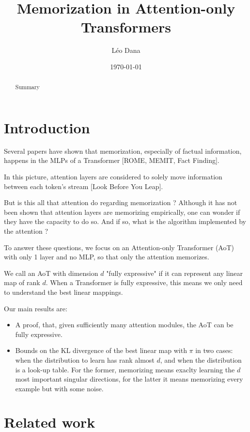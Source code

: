 \documentclass{article}
\title{Memorization in Attention-only Transformers}
\author{Léo Dana}
\date{\today}
\begin{document}
\maketitle


\begin{abstract}
    Summary
\end{abstract}

\section{Introduction}

Several papers have shown that memorization, especially of factual information, happens in the MLPs of a Transformer
[ROME, MEMIT, Fact Finding]. 
\bigbreak

In this picture, attention layers are considered to solely move information between each token's stream [Look Before You Leap].
\bigbreak

But is this all that attention do regarding memorization ? Although it has not been shown that attention layers are memorizing
empirically, one can wonder if they have the capacity to do so. And if so, what is the algorithm implemented by the attention ?
\bigbreak

To answer these questions, we focus on an Attention-only Transformer (AoT) with only 1 layer and no MLP, so that only the attention memorizes.
\bigbreak

We call an AoT with dimension $d$ "fully expressive" if it can represent any linear map of rank $d$. When a Transformer is fully 
expressive, this means we only need to understand the best linear mappings. 
\bigbreak

Our main results are:
\begin{itemize}
    \item A proof, that, given sufficiently many attention modules, the AoT can be fully expressive.
    \item Bounds on the KL divergence of the best linear map with $\pi$ in two cases: when the distribution to learn has rank almost $d$,
    and when the distribution is a look-up table. For the former, memorizing means exaclty learning the $d$ most important singular directions,
    for the latter it means memorizing every example but with some noise.
\end{itemize}


\section{Related work}
\end{document}

